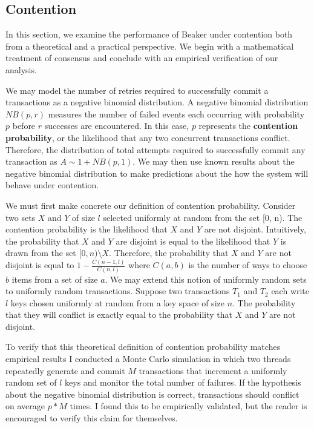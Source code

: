\documentclass{article}
\begin{document}
    \subsection{Contention}
    In this section, we examine the performance of Beaker under contention both from a theoretical
    and a practical perspective. We begin with a mathematical treatment of consensus and conclude with
    an empirical verification of our analysis.

    We may model the number of retries required to successfully commit a transactions as a negative
    binomial distribution. A negative binomial distribution $NB(p, r)$ measures the number of
    failed events each occurring with probability $p$ before $r$ successes are encountered. In
    this case, $p$ represents the \textbf{contention probability}, or the likelihood that any two
    concurrent transactions conflict. Therefore, the distribution of total attempts required to
    successfully commit any transaction as $A \sim 1 + NB(p, 1)$. We may then use known results about
    the negative binomial distribution to make predictions about the how the system will behave under
    contention.

    We must first make concrete our definition of contention probability. Consider two sets $X$ and
    $Y$ of size $l$ selected uniformly at random from the set [0, n). The contention probability is
    the likelihood that $X$ and $Y$ are not disjoint. Intuitively, the probability that $X$ and $Y$
    are disjoint is equal to the likelihood that $Y$ is drawn from the set $[0, n) \setminus X$.
    Therefore, the probability that $X$ and $Y$ are not disjoint is equal to
    $1 - \frac{C(n - 1, l)}{C(n, l)}$ where $C(a, b)$ is the number of ways to choose $b$ items from a
    set of size $a$. We may extend this notion of uniformly random sets to uniformly random
    transactions. Suppose two transactions $T_1$ and $T_2$ each write $l$ keys chosen uniformly at
    random from a key space of size $n$. The probability that they will conflict is exactly equal to
    the probability that $X$ and $Y$ are not disjoint.

    To verify that this theoretical definition of contention probability matches empirical results I
    conducted a Monte Carlo simulation in which two threads repeatedly generate and commit $M$
    transactions that increment a uniformly random set of $l$ keys and monitor the total number of
    failures. If the hypothesis about the negative binomial distribution is correct, transactions
    should conflict on average $p * M$ times. I found this to be empirically validated, but the reader
    is encouraged to verify this claim for themselves.
\end{document}
